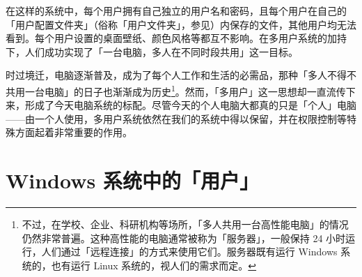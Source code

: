 在这样的系统中，每个用户拥有自己独立的用户名和密码，且每个用户在自己的「用户配置文件夹」（俗称「用户文件夹」，参见）内保存的文件，其他用户均无法看到。每个用户设置的桌面壁纸、颜色风格等都互不影响。在多用户系统的加持下，人们成功实现了「一台电脑，多人在不同时段共用」这一目标。

时过境迁，电脑逐渐普及，成为了每个人工作和生活的必需品，那种「多人不得不共用一台电脑」的日子也渐渐成为历史\footnote{不过，在学校、企业、科研机构等场所，「多人共用一台高性能电脑」的情况仍然非常普遍。这种高性能的电脑通常被称为「服务器」，一般保持 24 小时运行，人们通过「远程连接」的方式来使用它们。服务器既有运行 Windows 系统的，也有运行 Linux 系统的，视人们的需求而定。}。然而，「多用户」这一思想却一直流传下来，形成了今天电脑系统的标配。尽管今天的个人电脑大都真的只是「个人」电脑——由一个人使用，多用户系统依然在我们的系统中得以保留，并在权限控制等特殊方面起着非常重要的作用。

\section{Windows 系统中的「用户」}

